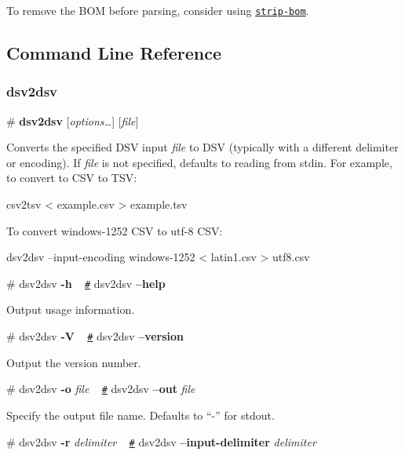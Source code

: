To remove the B\+OM before parsing, consider using \href{https://www.npmjs.com/package/strip-bom}{\tt strip-\/bom}.

\subsection*{Command Line Reference}

\subsubsection*{dsv2dsv}

\label{_dsv2dsv}%
\# {\bfseries dsv2dsv} \mbox{[}{\itshape options…}\mbox{]} \mbox{[}{\itshape file}\mbox{]}

Converts the specified D\+SV input {\itshape file} to D\+SV (typically with a different delimiter or encoding). If {\itshape file} is not specified, defaults to reading from stdin. For example, to convert to C\+SV to T\+SV\+:


\begin{DoxyCode}
csv2tsv < example.csv > example.tsv
\end{DoxyCode}


To convert windows-\/1252 C\+SV to utf-\/8 C\+SV\+:


\begin{DoxyCode}
dsv2dsv --input-encoding windows-1252 < latin1.csv > utf8.csv
\end{DoxyCode}


\label{_dsv2dsv_help}%
\# dsv2dsv {\bfseries -\/h} ~\newline
\href{dsv2dsv_help}{\tt \#} dsv2dsv {\bfseries --help}

Output usage information.

\label{_dsv2dsv_version}%
\# dsv2dsv {\bfseries -\/V} ~\newline
\href{dsv2dsv_version}{\tt \#} dsv2dsv {\bfseries --version}

Output the version number.

\label{_dsv2dsv_out}%
\# dsv2dsv {\bfseries -\/o} {\itshape file} ~\newline
\href{dsv2dsv_out}{\tt \#} dsv2dsv {\bfseries --out} {\itshape file}

Specify the output file name. Defaults to “-\/” for stdout.

\label{_dsv2dsv_input_delimiter}%
\# dsv2dsv {\bfseries -\/r} {\itshape delimiter} ~\newline
\href{dsv2dsv_input_delimiter}{\tt \#} dsv2dsv {\bfseries --input-\/delimiter} {\itshape delimiter}

